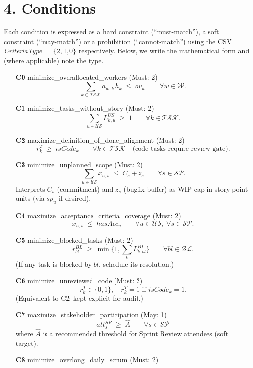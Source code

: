 \documentclass[11pt,a4paper]{article}
\begin{document}
\section{4. Conditions}
Each condition is expressed as a hard constraint (``must-match''), a soft constraint (``may-match'') or a prohibition (``cannot-match'') using the CSV \emph{CriteriaType} $=\{2,1,0\}$ respectively. Below, we write the mathematical form and (where applicable) note the type.

\begin{itemize}[leftmargin=1.2cm]
  \item[\textbf{C0} minimize\_overallocated\_workers \; (Must: 2)]
  \[
    \sum_{k\in\mathcal{TSK}} a_{w,k}\,h_k \;\le\; av_w \qquad \forall w\in\mathcal{W}.
  \]
  \item[\textbf{C1} minimize\_tasks\_without\_story \; (Must: 2)]
  \[
    \sum_{u\in\mathcal{US}} L^{US}_{k,u} \;\ge\; 1 \qquad \forall k\in\mathcal{TSK}.
  \]
  \item[\textbf{C2} maximize\_definition\_of\_done\_alignment \; (Must: 2)]
  \[
    r^T_k \;\ge\; isCode_k \qquad \forall k\in\mathcal{TSK}\quad
    \text{(code tasks require review gate).}
  \]
  \item[\textbf{C3} minimize\_unplanned\_scope \; (Must: 2)]
  \[
    \sum_{u\in\mathcal{US}} x_{u,s} \;\le\; C_s + z_s \qquad \forall s\in\mathcal{SP}.
  \]
  Interprets $C_s$ (commitment) and $z_s$ (bugfix buffer) as WIP cap in story-point units (via $sp_u$ if desired).
  \item[\textbf{C4} maximize\_acceptance\_criteria\_coverage \; (Must: 2)]
  \[
    x_{u,s} \;\le\; hasAcc_u \qquad \forall u\in\mathcal{US},\; \forall s\in\mathcal{SP}.
  \]
  \item[\textbf{C5} minimize\_blocked\_tasks \; (Must: 2)]
  \[
    r^{BL}_{bl} \;\ge\; \min\bigl\{1,\sum_{k} L^{BL}_{k,bl}\bigr\} \qquad \forall bl\in\mathcal{BL}.
  \]
  (If any task is blocked by $bl$, schedule its resolution.)
  \item[\textbf{C6} minimize\_unreviewed\_code \; (Must: 2)]
  \[
    r^T_k \in \{0,1\},\quad r^T_k=1 \text{ if } isCode_k=1.
  \]
  (Equivalent to C2; kept explicit for audit.)
  \item[\textbf{C7} maximize\_stakeholder\_participation \; (May: 1)]
  \[
    att^{SR}_s \;\ge\; \widehat{A} \qquad \forall s\in\mathcal{SP}
  \]
  where $\widehat{A}$ is a recommended threshold for Sprint Review attendees (soft target).
  \item[\textbf{C8} minimize\_overlong\_daily\_scrum \; (Must: 2)]

\end{itemize}
\end{document}
